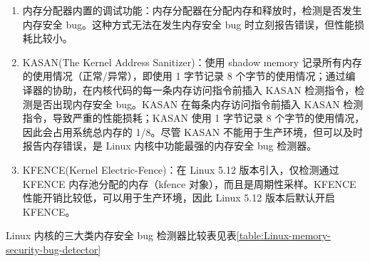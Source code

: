 \documentclass[AutoFakeBold]{LZUThesis}
\begin{document}
\begin{sloppypar}
\begin{enumerate}
\def\labelenumi{\arabic{enumi}.}
\item
  内存分配器内置的调试功能：内存分配器在分配内存和释放时，检测是否发生内存安全
  bug。这种方式无法在发生内存安全 bug 时立刻报告错误，但性能损耗比较小。
\item
  KASAN(The Kernel Address Sanitizer)：使用 shadow memory
  记录所有内存的使用情况（正常/异常），即使用 1 字节记录 8
  个字节的使用情况；通过编译器的协助，在内核代码的每一条内存访问指令前插入
  KASAN 检测指令，检测是否出现内存安全 bug。KASAN
  在每条内存访问指令前插入 KASAN 检测指令，导致严重的性能损耗；KASAN
  使用 1 字节记录 8 个字节的使用情况，因此会占用系统总内存的 1/8。尽管
  KASAN 不能用于生产环境，但可以及时报告内存错误，是 Linux
  内核中功能最强的内存安全 bug 检测器。
\item
  KFENCE(Kernel Electric-Fence)：在 Linux 5.12 版本引入，仅检测通过
  KFENCE 内存池分配的内存（kfence 对象），而且是周期性采样。KFENCE
  性能开销比较低，可以用于生产环境，因此 Linux 5.12 版本后默认开启
  KFENCE。
\end{enumerate}

Linux 内核的三大类内存安全 bug 检测器比较表见表\ref{table:Linux-memory-security-bug-detector}


\end{sloppypar}
\end{document}
